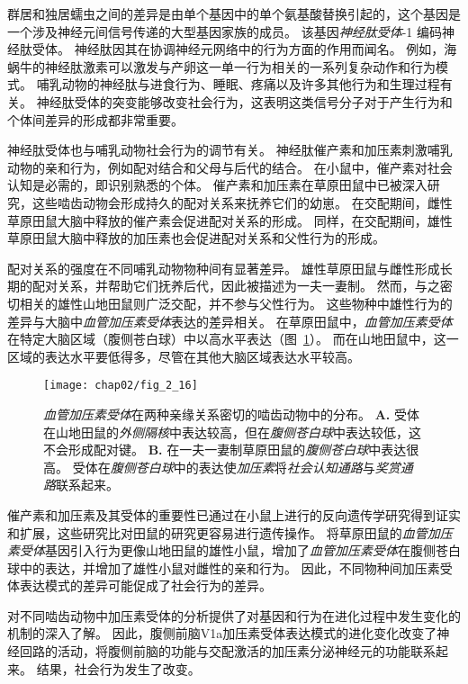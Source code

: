 群居和独居蠕虫之间的差异是由单个基因中的单个氨基酸替换引起的，这个基因是一个涉及神经元间信号传递的大型基因家族的成员。
该基因\textit{神经肽受体}-1 编码神经肽受体。
神经肽因其在协调神经元网络中的行为方面的作用而闻名。
例如，海蜗牛的神经肽激素可以激发与产卵这一单一行为相关的一系列复杂动作和行为模式。
哺乳动物的神经肽与进食行为、睡眠、疼痛以及许多其他行为和生理过程有关。
神经肽受体的突变能够改变社会行为，这表明这类信号分子对于产生行为和个体间差异的形成都非常重要。


神经肽受体也与哺乳动物社会行为的调节有关。
神经肽催产素和加压素刺激哺乳动物的亲和行为，例如配对结合和父母与后代的结合。
在小鼠中，催产素对社会认知是必需的，即识别熟悉的个体。
催产素和加压素在草原田鼠中已被深入研究，这些啮齿动物会形成持久的配对关系来抚养它们的幼崽。
在交配期间，雌性草原田鼠大脑中释放的催产素会促进配对关系的形成。
同样，在交配期间，雄性草原田鼠大脑中释放的加压素也会促进配对关系和父性行为的形成。



配对关系的强度在不同哺乳动物物种间有显著差异。
雄性草原田鼠与雌性形成长期的配对关系，并帮助它们抚养后代，因此被描述为一夫一妻制。
然而，与之密切相关的雄性山地田鼠则广泛交配，并不参与父性行为。
这些物种中雄性行为的差异与大脑中\textit{血管加压素受体}表达的差异相关。
在草原田鼠中，\textit{血管加压素受体}在特定大脑区域（腹侧苍白球）中以高水平表达（图~\ref{fig:2_16}）。 
而在山地田鼠中，这一区域的表达水平要低得多，尽管在其他大脑区域表达水平较高。


\begin{figure}[htbp]
	\centering
	\texttt{[image: chap02/fig\_2\_16]}
	\caption{\textit{血管加压素受体}在两种亲缘关系密切的啮齿动物中的分布\cite{young2001cellular}。
		\textbf{A.} 受体在山地田鼠的\textit{外侧隔核}中表达较高，但在\textit{腹侧苍白球}中表达较低，这不会形成配对键。
		\textbf{B.} 在一夫一妻制草原田鼠的\textit{腹侧苍白球}中表达很高。
		受体在\textit{腹侧苍白球}中的表达使\textit{加压素}将\textit{社会认知通路}与\textit{奖赏通路}联系起来。}
	\label{fig:2_16}
\end{figure}


催产素和加压素及其受体的重要性已通过在小鼠上进行的反向遗传学研究得到证实和扩展，这些研究比对田鼠的研究更容易进行遗传操作。
将草原田鼠的\textit{血管加压素受体}基因引入行为更像山地田鼠的雄性小鼠，增加了\textit{血管加压素受体}在腹侧苍白球中的表达，并增加了雄性小鼠对雌性的亲和行为。
因此，不同物种间加压素受体表达模式的差异可能促成了社会行为的差异。





对不同啮齿动物中加压素受体的分析提供了对基因和行为在进化过程中发生变化的机制的深入了解。
因此，腹侧前脑V1a加压素受体表达模式的进化变化改变了神经回路的活动，将腹侧前脑的功能与交配激活的加压素分泌神经元的功能联系起来。
结果，社会行为发生了改变。

